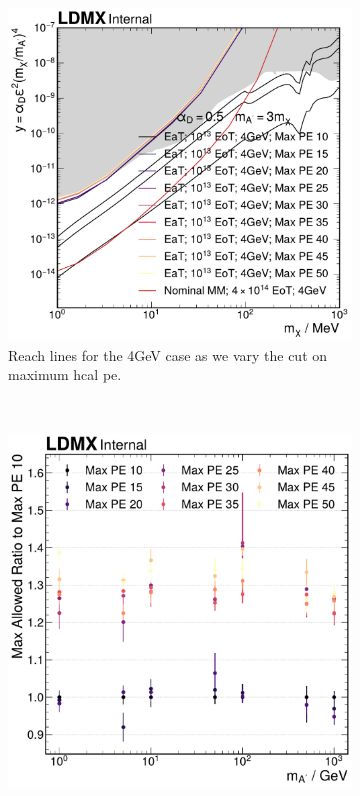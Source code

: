 \begin{figure}
  \centering
  \begin{subfigure}{0.48\textwidth}
    \centering
    \includegraphics[width=\textwidth]{figures/ldmx/analysis/systematics/max-pe-scan-4gev.pdf}
    \caption{Reach lines for the 4GeV case as we vary the cut on maximum \ac{hcal} \ac{pe}.}
    \label{fig:4gev-max-pe-scan:reach}
  \end{subfigure}
  ~
  \begin{subfigure}{0.48\textwidth}
    \centering
    \includegraphics[width=\textwidth]{figures/ldmx/analysis/systematics/max-pe-scan-4gev-msa-ratio.pdf}

\end{subfigure}
\end{figure}
